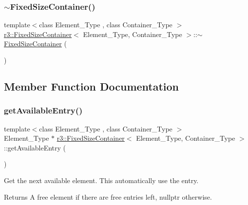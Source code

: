 \subsubsection{\texorpdfstring{$\sim$\+Fixed\+Size\+Container()}{~FixedSizeContainer()}}
{\footnotesize\ttfamily template$<$class Element\+\_\+\+Type , class Container\+\_\+\+Type $>$ \\
\mbox{\hyperlink{classr3_1_1_fixed_size_container}{r3\+::\+Fixed\+Size\+Container}}$<$ Element\+\_\+\+Type, Container\+\_\+\+Type $>$\+::$\sim$\mbox{\hyperlink{classr3_1_1_fixed_size_container}{Fixed\+Size\+Container}} (\begin{DoxyParamCaption}{ }\end{DoxyParamCaption})\hspace{0.3cm}{\ttfamily [default]}}



\subsection{Member Function Documentation}
\mbox{\label{classr3_1_1_fixed_size_container_a7903fc6d43600195b97218aead60a99a}} 
\subsubsection{\texorpdfstring{get\+Available\+Entry()}{getAvailableEntry()}}
{\footnotesize\ttfamily template$<$class Element\+\_\+\+Type , class Container\+\_\+\+Type $>$ \\
Element\+\_\+\+Type $\ast$ \mbox{\hyperlink{classr3_1_1_fixed_size_container}{r3\+::\+Fixed\+Size\+Container}}$<$ Element\+\_\+\+Type, Container\+\_\+\+Type $>$\+::get\+Available\+Entry (\begin{DoxyParamCaption}{ }\end{DoxyParamCaption})}



Get the next available element. This automatically use the entry. 

\begin{DoxyReturn}{Returns}
A free element if there are free entries left, nullptr otherwise. 
\end{DoxyReturn}
\mbox{\label{classr3_1_1_fixed_size_container_adbf383734c597677d4221278000886a3}} 
